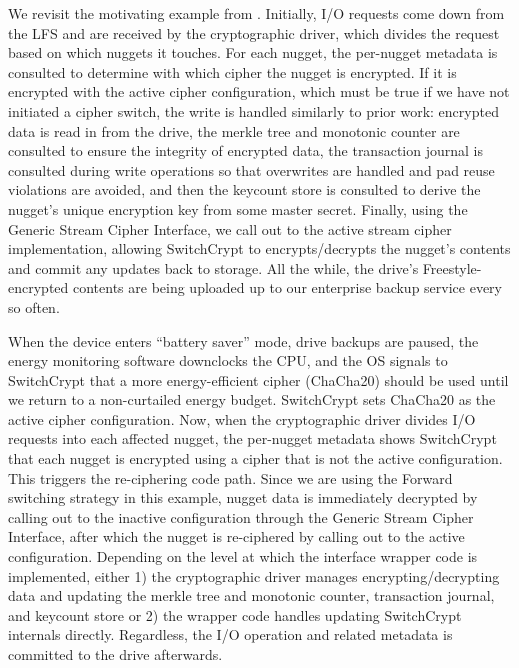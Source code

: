 We revisit the motivating example from . Initially, I/O
requests come down from the LFS and are received by the cryptographic driver,
which divides the request based on which nuggets it touches. For each nugget,
the per-nugget metadata is consulted to determine with which cipher the nugget
is encrypted. If it is encrypted with the active cipher configuration, which
must be true if we have not initiated a cipher switch, the write is handled
similarly to prior work: encrypted data is read in from the drive, the merkle
tree and monotonic counter are consulted to ensure the integrity of encrypted
data, the transaction journal is consulted during write operations so that
overwrites are handled and pad reuse violations are avoided, and then the
keycount store is consulted to derive the nugget's unique encryption key from
some master secret. Finally, using the Generic Stream Cipher Interface, we call
out to the active stream cipher implementation, allowing SwitchCrypt to
encrypts/decrypts the nugget's contents and commit any updates back to storage.
All the while, the drive's Freestyle-encrypted contents are being uploaded up to
our enterprise backup service every so often.

When the device enters ``battery saver'' mode, drive backups are paused, the
energy monitoring software downclocks the CPU, and the OS signals to SwitchCrypt
that a more energy-efficient cipher (ChaCha20) should be used until we return to
a non-curtailed energy budget. SwitchCrypt sets ChaCha20 as the active cipher
configuration. Now, when the cryptographic driver divides I/O requests into each
affected nugget, the per-nugget metadata shows SwitchCrypt that each nugget is
encrypted using a cipher that is not the active configuration. This triggers the
re-ciphering code path. Since we are using the Forward switching strategy in
this example, nugget data is immediately decrypted by calling out to the
inactive configuration through the Generic Stream Cipher Interface, after which
the nugget is re-ciphered by calling out to the active configuration. Depending
on the level at which the interface wrapper code is implemented, either 1) the
cryptographic driver manages encrypting/decrypting data and updating the merkle
tree and monotonic counter, transaction journal, and keycount store or 2) the
wrapper code handles updating SwitchCrypt internals directly. Regardless, the
I/O operation and related metadata is committed to the drive afterwards.

